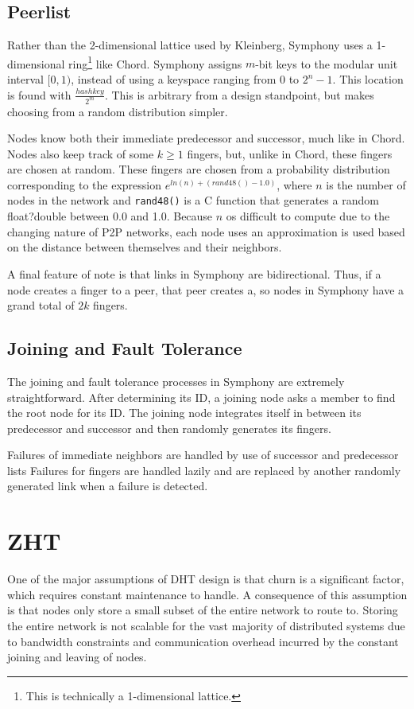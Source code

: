 \subsection*{Peerlist}
Rather than the 2-dimensional lattice used by Kleinberg, Symphony uses a 1-dimensional ring\footnote{This is technically a 1-dimensional lattice.} like Chord.
Symphony assigns $m$-bit keys to the modular unit interval $ [0,1)$, instead of using a keyspace ranging from 0 to $2^{n} - 1$.
This location is found  with $\frac{hashkey}{2^{m}}$.
This is arbitrary from a design standpoint, but makes choosing from a random distribution simpler. 

Nodes know both their immediate predecessor and successor, much like in Chord.
Nodes also keep track of some  $k \geq 1$ fingers, but, unlike in Chord, these fingers are chosen at random.
These fingers are chosen from a probability distribution corresponding to the expression $e^{ln(n) + (rand48() - 1.0)}$, where $n$ is the number of nodes in the network and \texttt{rand48()} is a C function that generates a random float?double between 0.0 and 1.0.
Because $n$ os difficult to compute due to the changing nature of P2P networks, each node uses an approximation is used based on the distance between themselves and their neighbors.

A final feature of note is that links in Symphony are bidirectional.
Thus, if a node creates a finger to a peer, that peer creates a, so nodes in Symphony have a grand total of $2k$ fingers.


\subsection*{Joining and Fault Tolerance}
The joining and fault tolerance processes in Symphony are extremely straightforward.
After determining its ID, a joining node asks a member to find the root node for its ID.
The joining node integrates itself in between its predecessor and successor and then randomly generates its fingers.

Failures of immediate neighbors are handled by use of successor and predecessor lists
Failures for fingers are handled lazily and are replaced by another randomly generated link when a failure is detected.

\section{ZHT}
One of the major assumptions of DHT design is that churn is a significant factor, which requires constant maintenance to handle.
A consequence of this assumption is that nodes only store a small subset of the entire network to route to.
Storing the entire network is not scalable for the vast majority of distributed systems due to bandwidth constraints and communication overhead incurred by the constant joining and leaving of nodes.

